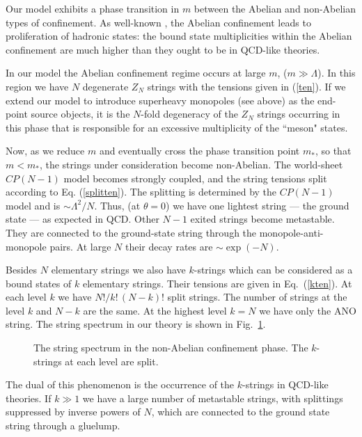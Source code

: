 Our model exhibits a phase transition in $m$ between  the Abelian and
non-Abelian types of confinement. As well-known \cite{DS,matt},
the Abelian confinement
leads to proliferation of hadronic states: the bound state 
multiplicities
within the Abelian confinement are much higher than they ought to
be in QCD-like theories.

In our model the Abelian confinement regime occurs at large $m$,
($m\gg\Lambda$). In this region we have $N$
degenerate $Z_N$  strings with the tensions given in (\ref{ten}).
If we extend our model to introduce superheavy monopoles  (see above)
as the end-point source objects, it is the $N$-fold degeneracy
of the $Z_N$ strings occurring in this phase that
is responsible for an excessive multiplicity of the ``meson"
states.

Now, as we  reduce $m$ and eventually cross  the phase transition point
$m_*$, so that $m <m_*$,
the strings under consideration become non-Abelian. The
world-sheet $CP(N-1)$ model becomes  strongly coupled,
and  the string tensions
split according to Eq. (\ref{splitten}). The splitting
is determined by the $CP(N-1)$ model and is $\sim \Lambda^2/N$. 
Thus,
(at $\theta=0$) we have  one lightest string --- the ground state --- 
as expected in QCD.
Other $N-1$ exited strings become metastable. They are
connected to the ground-state string through the monopole-anti-monopole
pairs.
At large $N$ their
decay rates are  $\sim \exp{(-N)}$.

Besides  $N$ elementary strings we also have $k$-strings which can be
considered as a bound states of $k$ 
elementary strings. Their tensions are given
in Eq.~(\ref{kten}). At each level $k$ we have $N!/k!\,(N-k)!$
split strings. The number of strings at the level
$k$ and $N-k$ are the same. At the highest  level $k=N$
we have only the ANO string.  The string spectrum in our theory is shown 
in Fig.~\ref{spectrum}.

\begin{figure}
\epsfxsize=3cm
\centerline{}
\caption{
The string spectrum in the non-Abelian confinement phase. The $k$-strings
at each level are split.}
\label{spectrum}
\end{figure}

The dual of this phenomenon is the occurrence of the
$k$-strings in QCD-like theories.
If $k\gg 1$ we have a large number of metastable strings, with 
splittings suppressed by inverse powers of $N$, which are connected to the
ground state string through a gluelump.

